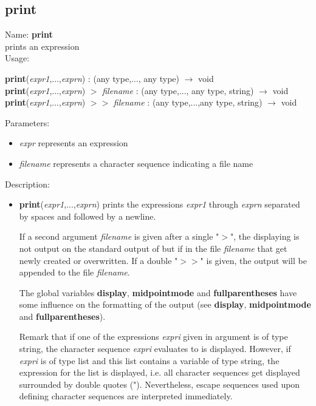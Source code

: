 \subsection{print}
\label{labprint}
\noindent Name: \textbf{print}\\
prints an expression\\
\noindent Usage: 
\begin{center}
\textbf{print}(\emph{expr1},...,\emph{exprn}) : (\textsf{any type},..., \textsf{any type}) $\rightarrow$ \textsf{void}\\
\textbf{print}(\emph{expr1},...,\emph{exprn}) $>$ \emph{filename} : (\textsf{any type},..., \textsf{any type}, \textsf{string}) $\rightarrow$ \textsf{void}\\
\textbf{print}(\emph{expr1},...,\emph{exprn}) $>>$ \emph{filename} : (\textsf{any type},...,\textsf{any type}, \textsf{string}) $\rightarrow$ \textsf{void}\\
\end{center}
Parameters: 
\begin{itemize}
\item \emph{expr} represents an expression
\item \emph{filename} represents a character sequence indicating a file name
\end{itemize}
\noindent Description: \begin{itemize}

\item \textbf{print}(\emph{expr1},...,\emph{exprn}) prints the expressions \emph{expr1} through
   \emph{exprn} separated by spaces and followed by a newline.
    
   If a second argument \emph{filename} is given after a single  "$>$", the
   displaying is not output on the standard output of \sollya but if in
   the file \emph{filename} that get newly created or overwritten. If a double
    "$>>$" is given, the output will be appended to the file \emph{filename}.
    
   The global variables \textbf{display}, \textbf{midpointmode} and \textbf{fullparentheses} have
   some influence on the formatting of the output (see \textbf{display},
   \textbf{midpointmode} and \textbf{fullparentheses}).
    
   Remark that if one of the expressions \emph{expri} given in argument is of
   type \textsf{string}, the character sequence \emph{expri} evaluates to is
   displayed. However, if \emph{expri} is of type \textsf{list} and this list
   contains a variable of type \textsf{string}, the expression for the list
   is displayed, i.e.  all character sequences get displayed surrounded
   by double quotes ("). Nevertheless, escape sequences used upon defining
   character sequences are interpreted immediately.
\end{itemize}
